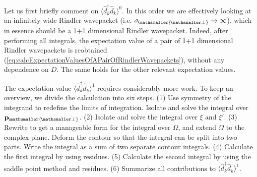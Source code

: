 \documentclass[11pt, a4paper]{article}
\def\bp{{\bf p}}
\newcommand{\Om}{\Omega}
\newcommand{\si}{{\sigma}}
\let\perptmp\perp
\renewcommand{\perp}{{\! \mathsmaller{\perptmp}}}
\newcommand{\nodagger}{{\phantom{\dagger}}}
\newcommand{\ddd}{\langle \hat d_k^\dagger \hat d^\nodagger_k \rangle}
\begin{document}
Let us first briefly comment on $\ddd^0$. In this order we are effectively looking at an infinitely wide Rindler wavepacket (i.e. $\si_\perp\to\infty$), which in essence should be a 1+1 dimensional Rindler wavepacket. Indeed, after performing all integrals, the expectation value of a pair of 1+1 dimensional Rindler wavepackets is reobtained (\ref{eq:calcExpectationValuesOfAPairOfRindlerWavepackets}), without any dependence on $D$. The same holds for the other relevant expectation values.

The expectation value $\langle \hat d_k^\dagger \hat d_k \rangle^1$ requires considerably more work. To keep an overview, we divide the calculation into six steps. (1) Use symmetry of the integrand to redefine the limits of integration. Isolate and solve the integral over  $\bp_\perp$. (2)  Isolate and solve the integral over $\xi$ and $\xi'$. (3) Rewrite to get a manageable form for the integral over $\Om$, and extend $\Om$ to the complex plane. Deform the contour so that the integral can be split into two parts. Write the integral as a sum of two separate contour integrals. (4) Calculate the first integral by using residues. (5) Calculate the second integral by using the saddle point method and residues. (6) Summarize all contributions to $\ddd^1$.
\end{document}
